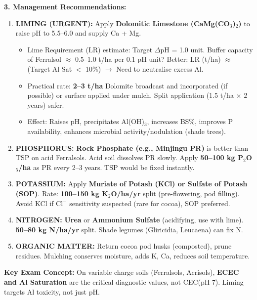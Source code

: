 \documentclass[11pt]{article}
\begin{document}
\begin{exoresolu}
\noindent\textbf{3. Management Recommendations:}
\begin{enumerate}
\item \textbf{LIMING (URGENT):} Apply \textbf{Dolomitic Limestone (CaMg(CO$_3$)$_2$)} to raise pH to 5.5--6.0 and supply Ca + Mg.
      \begin{itemize}
      \item Lime Requirement (LR) estimate: Target $\Delta$pH = 1.0 unit. Buffer capacity of Ferralsol $\approx$ 0.5--1.0 t/ha per 0.1 pH unit? Better: LR (t/ha) $\approx$ (Target Al Sat $<$ 10\%) $\rightarrow$ Need to neutralise excess Al. 
      \item Practical rate: \textbf{2--3 t/ha} Dolomite broadcast and incorporated (if possible) or surface applied under mulch. Split application (1.5 t/ha $\times$ 2 years) safer.
      \item Effect: Raises pH, precipitates Al(OH)$_3$, increases BS\%, improves P availability, enhances microbial activity/nodulation (shade trees).
      \end{itemize}
\item \textbf{PHOSPHORUS:} \textbf{Rock Phosphate (e.g., Minjingu PR)} is better than TSP on acid Ferralsols. Acid soil dissolves PR slowly. Apply \textbf{50--100 kg P$_2$O$_5$/ha} as PR every 2--3 years. TSP would be fixed instantly.
\item \textbf{POTASSIUM:} Apply \textbf{Muriate of Potash (KCl) or Sulfate of Potash (SOP)}. Rate: \textbf{100--150 kg K$_2$O/ha/yr} split (pre-flowering, pod filling). Avoid KCl if Cl$^-$ sensitivity suspected (rare for cocoa), SOP preferred.
\item \textbf{NITROGEN:} \textbf{Urea} or \textbf{Ammonium Sulfate} (acidifying, use with lime). \textbf{50--80 kg N/ha/yr} split. Shade legumes (Gliricidia, Leucaena) can fix N.
\item \textbf{ORGANIC MATTER:} Return cocoa pod husks (composted), prune residues. Mulching conserves moisture, adds K, Ca, reduces soil temperature.
\end{enumerate}

\noindent\textbf{Key Exam Concept:} On variable charge soils (Ferralsols, Acrisols), \textbf{ECEC and Al Saturation} are the critical diagnostic values, not CEC(pH 7). Liming targets Al toxicity, not just pH.
\end{exoresolu}
\end{document}
